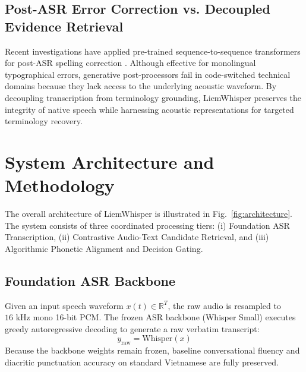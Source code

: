\documentclass[11pt,conference,onecolumn]{IEEEtran}
\begin{document}
\subsection{Post-ASR Error Correction vs. Decoupled Evidence Retrieval}
Recent investigations have applied pre-trained sequence-to-sequence transformers for post-ASR spelling correction \cite{raffel2020exploring, hu2021lora}. Although effective for monolingual typographical errors, generative post-processors fail in code-switched technical domains because they lack access to the underlying acoustic waveform. By decoupling transcription from terminology grounding, LiemWhisper preserves the integrity of native speech while harnessing acoustic representations for targeted terminology recovery.

\section{System Architecture and Methodology}

The overall architecture of LiemWhisper is illustrated in Fig.~\ref{fig:architecture}. The system consists of three coordinated processing tiers: (i) Foundation ASR Transcription, (ii) Contrastive Audio-Text Candidate Retrieval, and (iii) Algorithmic Phonetic Alignment and Decision Gating.

\subsection{Foundation ASR Backbone}
Given an input speech waveform $x(t) \in \mathbb{R}^T$, the raw audio is resampled to $16\text{ kHz}$ mono 16-bit PCM. The frozen ASR backbone (Whisper Small) executes greedy autoregressive decoding to generate a raw verbatim transcript:
\begin{equation}
y_{\text{raw}} = \text{Whisper}(x)
\end{equation}
Because the backbone weights remain frozen, baseline conversational fluency and diacritic punctuation accuracy on standard Vietnamese are fully preserved.
\end{document}
